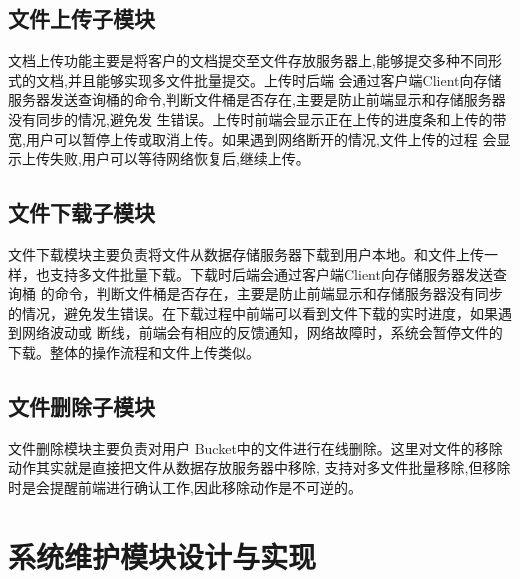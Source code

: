 \subsection{文件上传子模块}

文档上传功能主要是将客户的文档提交至文件存放服务器上,能够提交多种不同形式的文档,并且能够实现多文件批量提交。上传时后端
会通过客户端Client向存储服务器发送查询桶的命令,判断文件桶是否存在,主要是防止前端显示和存储服务器没有同步的情况,避免发
生错误。上传时前端会显示正在上传的进度条和上传的带宽,用户可以暂停上传或取消上传。如果遇到网络断开的情况,文件上传的过程
会显示上传失败,用户可以等待网络恢复后,继续上传。

\subsection{文件下载子模块}
文件下载模块主要负责将文件从数据存储服务器下载到用户本地。和文件上传一样，也支持多文件批量下载。下载时后端会通过客户端Client向存储服务器发送查询桶
的命令，判断文件桶是否存在，主要是防止前端显示和存储服务器没有同步的情况，避免发生错误。在下载过程中前端可以看到文件下载的实时进度，如果遇到网络波动或
断线，前端会有相应的反馈通知，网络故障时，系统会暂停文件的下载。整体的操作流程和文件上传类似。

\subsection{文件删除子模块}

文件删除模块主要负责对用户 Bucket中的文件进行在线删除。这里对文件的移除动作其实就是直接把文件从数据存放服务器中移除,
支持对多文件批量移除,但移除时是会提醒前端进行确认工作,因此移除动作是不可逆的。

\section{系统维护模块设计与实现}

